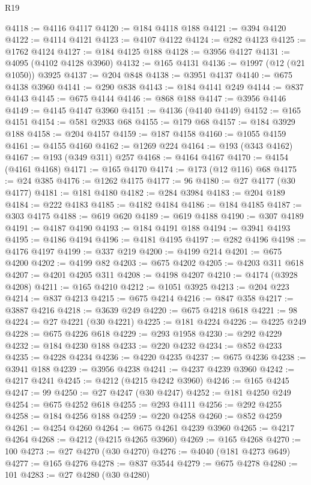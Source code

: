 \begin{lexlean}{R19}
\begin{coremodule}
@4118 := @4116 @4117
@4120 := @184 @4118 @188
@4121 := @394 @4120
@4122 := @4114 @4121
@4123 := @4107 @4122
@4124 := @282 @4123
@4125 := @1762 @4124
@4127 := @184 @4125 @188
@4128 := @3956 @4127
@4131 := @4095 (@4102 @4128 @3960)
@4132 := @165 @4131
@4136 := @1997 (@12 (@21 @1050)) @3925
@4137 := @204 @848
@4138 := @3951 @4137
@4140 := @675 @4138 @3960
@4141 := @290 @838
@4143 := @184 @4141 @249
@4144 := @837 @4143
@4145 := @675 @4144
@4146 := @868 @188
@4147 := @3956 @4146
@4149 := @4145 @4147 @3960
@4151 := @4136 (@4140 @4149)
@4152 := @165 @4151
@4154 := @581 @2933 @68
@4155 := @179 @68
@4157 := @184 @3929 @188
@4158 := @204 @4157
@4159 := @187 @4158
@4160 := @1055 @4159
@4161 := @4155 @4160
@4162 := @1269 @224
@4164 := @193 (@343 @4162)
@4167 := @193 (@349 @311) @257
@4168 := @4164 @4167
@4170 := @4154 (@4161 @4168)
@4171 := @165 @4170
@4174 := @173 (@12 @116) @68
@4175 := @24 @385
@4176 := @1262 @4175
@4177 := 96
@4180 := @27 @4177 (@30 @4177)
@4181 := @181 @4180
@4182 := @284 @3984
@4183 := @204 @189
@4184 := @222 @4183
@4185 := @4182 @4184
@4186 := @184 @4185
@4187 := @303 @4175
@4188 := @619 @620
@4189 := @619 @4188
@4190 := @307 @4189
@4191 := @4187 @4190
@4193 := @184 @4191 @188
@4194 := @3941 @4193
@4195 := @4186 @4194
@4196 := @4181 @4195
@4197 := @282 @4196
@4198 := @4176 @4197
@4199 := @337 @219
@4200 := @4199 @214
@4201 := @675 @4200
@4202 := @4199 @82
@4203 := @675 @4202
@4205 := @4203 @311 @618
@4207 := @4201 @4205 @311
@4208 := @4198 @4207
@4210 := @4174 (@3928 @4208)
@4211 := @165 @4210
@4212 := @1051 @3925
@4213 := @204 @223
@4214 := @837 @4213
@4215 := @675 @4214
@4216 := @847 @358
@4217 := @3887 @4216
@4218 := @3639 @249
@4220 := @675 @4218 @618
@4221 := 98
@4224 := @27 @4221 (@30 @4221)
@4225 := @181 @4224
@4226 := @4225 @249
@4228 := @675 @4226 @618
@4229 := @293 @1958
@4230 := @292 @4229
@4232 := @184 @4230 @188
@4233 := @220 @4232
@4234 := @852 @4233
@4235 := @4228 @4234
@4236 := @4220 @4235
@4237 := @675 @4236
@4238 := @3941 @188
@4239 := @3956 @4238
@4241 := @4237 @4239 @3960
@4242 := @4217 @4241
@4245 := @4212 (@4215 @4242 @3960)
@4246 := @165 @4245
@4247 := 99
@4250 := @27 @4247 (@30 @4247)
@4252 := @181 @4250 @249
@4254 := @675 @4252 @618
@4255 := @293 @4111
@4256 := @292 @4255
@4258 := @184 @4256 @188
@4259 := @220 @4258
@4260 := @852 @4259
@4261 := @4254 @4260
@4264 := @675 @4261 @4239 @3960
@4265 := @4217 @4264
@4268 := @4212 (@4215 @4265 @3960)
@4269 := @165 @4268
@4270 := 100
@4273 := @27 @4270 (@30 @4270)
@4276 := @4040 (@181 @4273 @649)
@4277 := @165 @4276
@4278 := @837 @3544
@4279 := @675 @4278
@4280 := 101
@4283 := @27 @4280 (@30 @4280)

\end{coremodule}
\end{lexlean}
